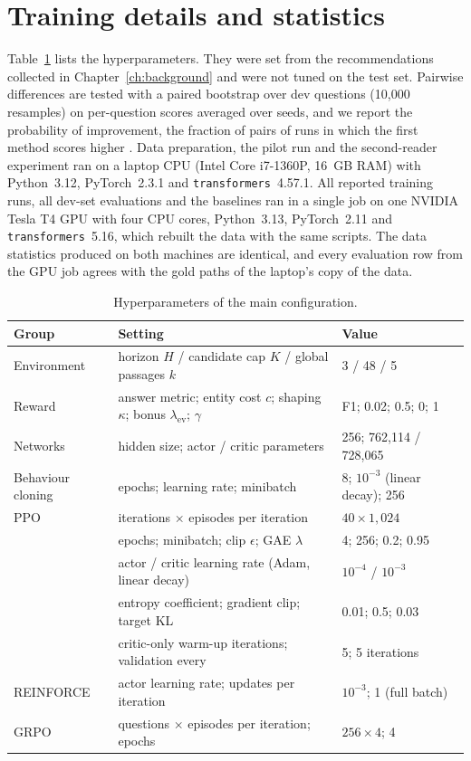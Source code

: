 \section{Training details and statistics}

Table~\ref{tab:hparams} lists the hyperparameters. They were set from the recommendations collected in Chapter~\ref{ch:background} and were not tuned on the test set.   Pairwise differences are tested with a paired bootstrap over dev questions (10{,}000 resamples) on per-question scores averaged over seeds, and we report the probability of improvement, the fraction of pairs of runs in which the first method scores higher \citep{agarwal2021deep}. Data preparation, the pilot run and the second-reader experiment ran on a laptop CPU (Intel Core i7-1360P, 16~GB RAM) with Python~3.12, PyTorch~2.3.1 and \texttt{transformers}~4.57.1. All reported training runs, all dev-set evaluations and the baselines ran in a single job on one NVIDIA Tesla T4 GPU with four CPU cores, Python~3.13, PyTorch~2.11 and \texttt{transformers}~5.16, which rebuilt the data with the same scripts. The data statistics produced on both machines are identical, and every evaluation row from the GPU job agrees with the gold paths of the laptop's copy of the data.

\begin{table}[ht]
\centering
\small
\caption{Hyperparameters of the main configuration.}
\label{tab:hparams}
\begin{tabular}{@{}lll@{}}
\toprule
Group & Setting & Value \\
\midrule
Environment & horizon $H$ / candidate cap $K$ / global passages $k$ & 3 / 48 / 5 \\
Reward & answer metric; entity cost $c$; shaping $\kappa$; bonus $\lambda_{\mathrm{ev}}$; $\gamma$ & F1; 0.02; 0.5; 0; 1 \\
Networks & hidden size; actor / critic parameters & 256; 762{,}114 / 728{,}065 \\
Behaviour cloning & epochs; learning rate; minibatch & 8; $10^{-3}$ (linear decay); 256 \\
PPO & iterations $\times$ episodes per iteration & $40\times1{,}024$ \\
 & epochs; minibatch; clip $\epsilon$; GAE $\lambda$ & 4; 256; 0.2; 0.95 \\
 & actor / critic learning rate (Adam, linear decay) & $10^{-4}$ / $10^{-3}$ \\
 & entropy coefficient; gradient clip; target KL & 0.01; 0.5; 0.03 \\
 & critic-only warm-up iterations; validation every & 5; 5 iterations \\
REINFORCE & actor learning rate; updates per iteration & $10^{-3}$; 1 (full batch) \\
GRPO & questions $\times$ episodes per iteration; epochs & $256\times4$; 4 \\
\bottomrule
\end{tabular}
\end{table}
